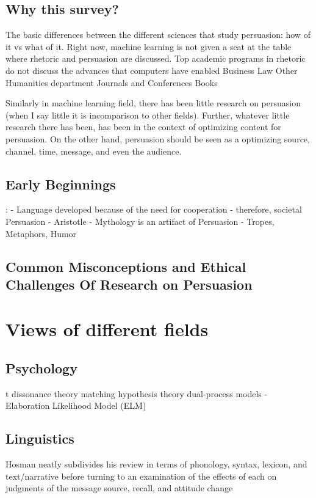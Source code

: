 \documentclass{article} %
\begin{document}
\subsection{Why this survey?}
The basic differences between the different sciences that study persuasion: how of it vs what of it. 
Right now, machine learning is not given a seat at the table where rhetoric and persuasion are discussed. 
Top academic programs in rhetoric do not discuss the advances that computers have enabled
    Business
    Law
    Other Humanities department
Journals and Conferences
Books


Similarly in machine learning field, there has been little research on persuasion (when I say little it is incomparison to other fields). 
Further, whatever little research there has been, has been in the context of optimizing content for persuasion. On the other hand, persuasion should be seen as a optimizing source, channel, time, message, and even the audience.


\subsection{Early Beginnings}:
    - Language developed because of the need for cooperation - therefore, societal Persuasion
    - Aristotle
    - Mythology is an artifact of Persuasion
    - Tropes, Metaphors, Humor


\subsection{Common Misconceptions and Ethical Challenges Of Research on Persuasion}



\section{Views of different fields}




    \subsection{Psychology} 
        t dissonance theory
        matching hypothesis theory
        dual-process models - Elaboration Likelihood Model (ELM)

    \subsection{Linguistics}
     Hosman neatly subdivides his review in terms of phonology, syntax, lexicon, and text/narrative before turning to an examination of the effects of each on judgments of the message source, recall, and attitude change
    
\end{document}
